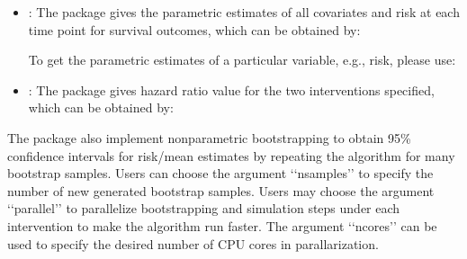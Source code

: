 \documentclass[letterpaper,10pt,english]{sphinxmanual}
\begin{document}
\begin{itemize}
\item {} 
\sphinxAtStartPar
{}: The package gives the parametric estimates of all covariates and risk at each time point for survival outcomes, which can be obtained by:
\begin{quote}

\begin{sphinxVerbatim}[commandchars=\\\{\}]
  \PYG{p}{[}\PYG{p}{]}
\end{sphinxVerbatim}
\end{quote}

\sphinxAtStartPar
To get the parametric estimates of a particular variable, e.g., risk, please use:
\begin{quote}

\begin{sphinxVerbatim}[commandchars=\\\{\}]
  \PYG{p}{[}\PYG{p}{]}\PYG{p}{[}\PYG{p}{]}
\end{sphinxVerbatim}
\end{quote}

\item {} 
\sphinxAtStartPar
{}: The package gives hazard ratio value for the two interventions specified, which can be obtained by:
\begin{quote}

\begin{sphinxVerbatim}[commandchars=\\\{\}]
  \PYG{p}{[}\PYG{p}{]}
\end{sphinxVerbatim}
\end{quote}

\end{itemize}

\sphinxAtStartPar
The package also implement nonparametric bootstrapping to obtain 95\% confidence intervals for risk/mean estimates
by repeating the algorithm for many bootstrap samples. Users can choose the argument ‘‘nsamples’’ to specify the number of new generated bootstrap samples.
Users may choose the argument ‘‘parallel’’ to parallelize bootstrapping and simulation steps under each intervention to
make the algorithm run faster. The argument ‘‘ncores’’ can be used to specify the desired number of CPU cores
in parallarization.
\end{document}
